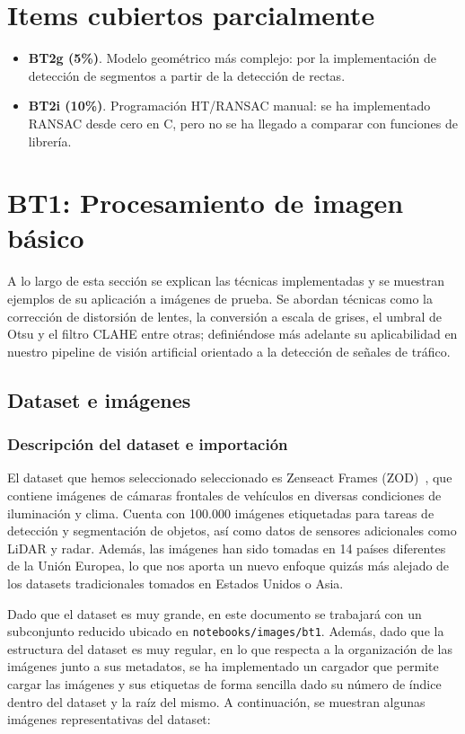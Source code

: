 \documentclass[11pt,a4paper]{article}
\begin{document}
\section*{Items cubiertos parcialmente}
\begin{itemize}
  \item \textbf{BT2g (5\%)}. Modelo geométrico más complejo: por la implementación de detección de segmentos a partir de la detección de rectas.
  \item \textbf{BT2i (10\%)}. Programación HT/RANSAC manual: se ha implementado RANSAC desde cero en C, pero no se ha llegado a comparar con funciones de librería.
\end{itemize}

\clearpage

\section{BT1: Procesamiento de imagen básico}

A lo largo de esta sección se explican las técnicas implementadas y
se muestran ejemplos de su aplicación a imágenes de prueba. Se
abordan técnicas como la corrección de distorsión de lentes, la
conversión a escala de grises, el umbral de Otsu y el filtro CLAHE
entre otras; definiéndose más adelante su aplicabilidad en nuestro
pipeline de visión artificial orientado a la detección de señales de tráfico.

\subsection{Dataset e imágenes}

\subsubsection{Descripción del dataset e importación}

El dataset que hemos seleccionado seleccionado es 
Zenseact Frames (ZOD)~\cite{zod}, que contiene
imágenes de cámaras frontales de vehículos en diversas condiciones de
iluminación y clima. Cuenta con 100.000 imágenes etiquetadas para
tareas de detección y segmentación de objetos, así como datos de
sensores adicionales como LiDAR y radar. Además, las imágenes han
sido tomadas en 14 países diferentes de la Unión Europea, lo que nos
aporta un nuevo enfoque quizás más alejado de los datasets
tradicionales tomados en Estados Unidos o Asia.

Dado que el dataset es muy grande, en este documento se trabajará con
un subconjunto reducido ubicado en \texttt{notebooks/images/bt1}. Además, dado
que la estructura del dataset es muy regular, en lo que respecta a la
organización de las imágenes junto a sus metadatos, se ha
implementado un cargador que permite cargar las imágenes y sus
etiquetas de forma sencilla dado su número de índice dentro del
dataset y la raíz del mismo. A continuación, se muestran algunas
imágenes representativas del dataset:
\end{document}
